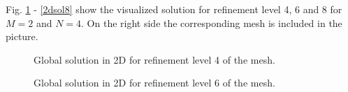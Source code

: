 \documentclass[a4paper, 11pt, twoside]{article}
\begin{document}
Fig. \ref{2dsol4} - \ref{2dsol8} show the visualized solution for refinement level 4, 6 and 8 for $M=2$ and $N=4$. On the right side the corresponding mesh is included in the picture.
\begin{figure}[h!]
	\centering
\caption{Global solution in 2D for refinement level 4 of the mesh.}
\label{2dsol4}
\end{figure}

\begin{figure}[h!]
	\centering
\caption{Global solution in 2D for refinement level 6 of the mesh.}
\label{2dsol6}
\end{figure}
\end{document}
